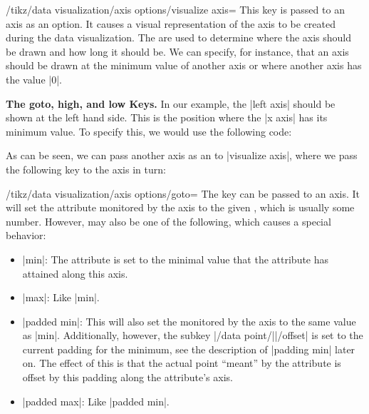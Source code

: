 \begin{key}{/tikz/data visualization/axis options/visualize axis=}
    This key is passed to an axis as an option. It causes a visual representation of the axis to be created during the data visualization. The  are used to determine where the axis should be drawn and how long it should be. We can specify, for instance, that an axis should be drawn at the minimum value of another axis or where another axis has the value |0|.


    \medskip
    \textbf{The goto, high, and low Keys.}
    In our example, the |left axis| should be shown at the left hand side. This is the position where the |x axis| has its minimum value. To specify this, we would use the following code:
\begin{codeexample}[code only]
left axis={ visualize axis={ x axis={ goto=min } }
\end{codeexample}
    As can be seen, we can pass another axis as an  to |visualize axis|, where we pass the following key to the axis in turn:
    \begin{key}{/tikz/data visualization/axis options/goto=}
        The key can be passed to an axis. It will set the attribute monitored by the axis to the given , which is usually some number. However,  may also be one of the following, which causes a special behavior:
        \begin{itemize}
            \item |min|: The attribute is set to the minimal value that the attribute has attained along this axis.
            \item |max|: Like |min|.
            \item |padded min|: This will also set the 
                monitored by the axis to the same value as |min|. Additionally, however, the subkey |/data point/||/offset| is set to the current padding for the minimum, see the description of |padding min| later on. The effect of this is that the actual point ``meant'' by the attribute is offset by this padding along the attribute's axis.
            \item |padded max|: Like |padded min|.
        \end{itemize}
    \end{key}


\end{key}
